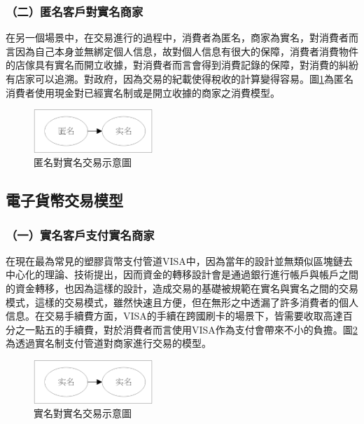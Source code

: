 		\subsubsection{（二）匿名客戶對實名商家}
		在另一個場景中，在交易進行的過程中，消費者為匿名，商家為實名，對消費者而言因為自己本身並無綁定個人信息，故對個人信息有很大的保障，消費者消費物件的店傢具有實名而開立收據，對消費者而言會得到消費記錄的保障，對消費的糾紛有店家可以追溯。對政府，因為交易的紀載使得稅收的計算變得容易。圖\ref{modean}為匿名消費者使用現金對已經實名制或是開立收據的商家之消費模型。

		\begin{figure}[!htbp]
			\centering
			\includegraphics[width = 0.4\textwidth]{modean.png}
			\caption{匿名對實名交易示意圖}\label{modean}
		\end{figure}

	\subsection{電子貨幣交易模型}

		\subsubsection{（一）實名客戶支付實名商家}
		在現在最為常見的塑膠貨幣支付管道VISA中，因為當年的設計並無類似區塊鏈去中心化的理論、技術提出，因而資金的轉移設計會是通過銀行進行帳戶與帳戶之間的資金轉移，也因為這樣的設計，造成交易的基礎被規範在實名與實名之間的交易模式，這樣的交易模式，雖然快速且方便，但在無形之中透漏了許多消費者的個人信息。在交易手續費方面，VISA的手續在跨國刷卡的場景下，皆需要收取高達百分之一點五的手續費，對於消費者而言使用VISA作為支付會帶來不小的負擔。圖\ref{modenn}為透過實名制支付管道對商家進行交易的模型。

		\begin{figure}[!htbp]
			\centering
			\includegraphics[width = 0.4\textwidth]{modenn.png}
			\caption{實名對實名交易示意圖}\label{modenn}
		\end{figure}

